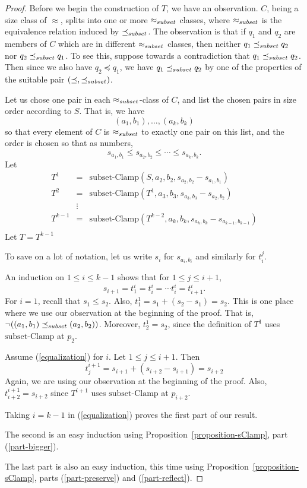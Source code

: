 \documentclass[12pt]{article}
\theoremstyle{definition}
\newcommand{\nott}{\neg}
\newcommand{\sClamp}{\mbox{subset-Clamp}}
\newcommand{\precsubseteq}{\preceq_{\scriptsize subset}}
\newcommand{\approxsubset}{\approx_{\scriptsize subset}}
\begin{document}
\begin{proof}
Before we begin the construction of $T$,
we have an observation.
$C$, being a size class of $\approx$, splits into one or more
$\approxsubset$ classes, where $\approxsubset$ is the equivalence relation induced by $\precsubseteq$.
The observation is that if $q_1$ and $q_2$ are members of $C$ which are in different $\approxsubset$
classes, then neither $q_1 \precsubseteq q_2$ nor  $q_2 \precsubseteq q_1$.
To see this, suppose towards a contradiction that  $q_1 \precsubseteq q_2$.
Then since we also have $q_2 \preceq q_1$, we have 
$q_1 \precsubseteq q_2$ by one of the properties of the suitable pair $(\preceq, \precsubseteq)$.



Let us chose one pair in each $\approxsubset$-class of 
$C$, and list the chosen pairs in size order according to $S$.
That is, we have 
\[ (a_1, b_1), \ldots, (a_k,b_k) \]
so that every element of $C$ is $\approxsubset$ to exactly one pair on this list,
and the order is chosen so that as numbers,
\[  s_{a_1, b_1} \leq s_{a_2, b_2} \leq \cdots\leq s_{a_k, b_k}.
\]
 Let \[ \begin{array}{lcl}
 T^1  & = &  \sClamp(S,a_2,b_2,s_{a_2, b_2} - s_{a_1, b_1})\\
T^2 & = & \sClamp(T^1,a_3, b_3, s_{a_3, b_3} - s_{a_2, b_2} )\\
  & \vdots   & \\
T^{k-1} & = & \sClamp(T^{k-2},a_k,b_k,
s_{a_k, b_k} - s_{a_{k-1}, b_{k-1}})\\
\end{array}
\]
Let $T = T^{k-1}$

To save on a lot of notation, let us write $s_i$ for $s_{a_i, b_i}$
and similarly for $t^j_i$.

An induction on $1\leq i \leq k -1$ shows that
for $1 \leq j \leq i+1$,
\begin{equation}
\label{equalization}
s_{i+1}  = t^i_{1} = t^i_{i} = \cdots t^i_{i} =  t^i_{i+1}.
\end{equation}
For $i = 1$, recall that $s_1 \leq s_2$.
Also, $t^1_1 = s_1 + (s_2 - s_1) = s_2$.
This is one place where we use our observation at the beginning of the proof.
That is, $\nott ((a_1,b_1) \precsubseteq (a_2,b_2))$.
Moreover, $t^1_2= s_2$, since 
the definition of $T^1$ uses $\sClamp$ at $p_2$.



Assume (\ref{equalization}) for  $i$.
Let   $1\leq j \leq i+1$.
Then \[ t^{i+1}_j = s_{i+1} + (s_{i+2} - s_{i+1}) 
= s_{i+2}\]
Again, we are using  our observation at the beginning of the proof.
Also, $t^{i+1}_{i+2} = s_{i+2} $ since $T^{i+1}$ uses $\sClamp$
at $p_{i+2}$.

Taking $i = k -1$ in (\ref{equalization}) proves the first part of our result.

The second is an easy induction using Proposition~\ref{proposition-sClamp}, part (\ref{part-bigger}).

The last part is also an easy induction, this time using 
 Proposition~\ref{proposition-sClamp}, parts (\ref{part-preserve}) and (\ref{part-reflect}).
\end{proof}
\end{document}
